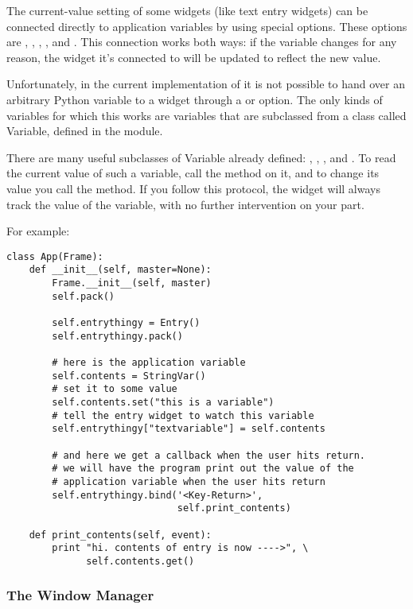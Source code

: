 The current-value setting of some widgets (like text entry widgets)
can be connected directly to application variables by using special
options.  These options are , ,
, , and .  This
connection works both ways: if the variable changes for any reason,
the widget it's connected to will be updated to reflect the new value. 

Unfortunately, in the current implementation of  it is
not possible to hand over an arbitrary Python variable to a widget
through a  or  option.  The only
kinds of variables for which this works are variables that are
subclassed from a class called Variable, defined in the
 module.

There are many useful subclasses of Variable already defined:
, , , and
.  To read the current value of such a variable,
call the  method on
it, and to change its value you call the  method.  If
you follow this protocol, the widget will always track the value of
the variable, with no further intervention on your part.

For example: 
\begin{verbatim}
class App(Frame):
    def __init__(self, master=None):
        Frame.__init__(self, master)
        self.pack()
        
        self.entrythingy = Entry()
        self.entrythingy.pack()
        
        # here is the application variable
        self.contents = StringVar()
        # set it to some value
        self.contents.set("this is a variable")
        # tell the entry widget to watch this variable
        self.entrythingy["textvariable"] = self.contents
        
        # and here we get a callback when the user hits return.
        # we will have the program print out the value of the
        # application variable when the user hits return
        self.entrythingy.bind('<Key-Return>',
                              self.print_contents)

    def print_contents(self, event):
        print "hi. contents of entry is now ---->", \
              self.contents.get()
\end{verbatim}


\subsubsection{The Window Manager} %

